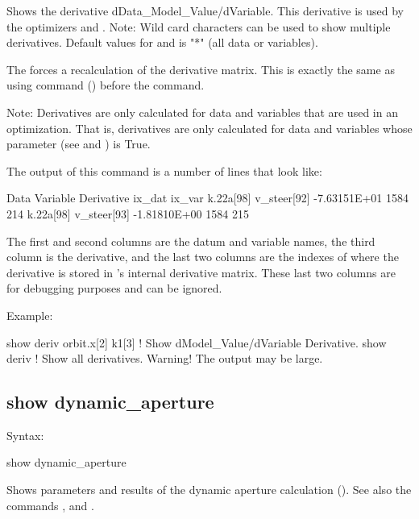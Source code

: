 {{{{{{{{
Shows the derivative dData_Model_Value/dVariable. This derivative is used by the optimizers 
and . Note: Wild card characters can be used to show multiple derivatives.  Default values
for  and  is "*" (all data or variables).

The  forces a recalculation of the derivative matrix. This is exactly the
same as using  command () before the  command.

Note: Derivatives are only calculated for data and variables that are used in an optimization. That
is, derivatives are only calculated for data and variables whose  parameter (see
 and ) is True.

The output of this command is a number of lines that look like:
\begin{example}
  Data                Variable               Derivative   ix_dat  ix_var
  k.22a[98]           v_steer[92]           -7.63151E+01    1584     214
  k.22a[98]           v_steer[93]           -1.81810E+00    1584     215
\end{example}
The first and second columns are the datum and variable names, the third column is the derivative,
and the last two columns are the indexes of where the derivative is stored in \tao's internal
derivative matrix. These last two columns are for debugging purposes and can be ignored.

Example:
\begin{example}
  show deriv orbit.x[2] k1[3] ! Show dModel_Value/dVariable Derivative.
  show deriv                  ! Show all derivatives. Warning! The output may be large.

\end{example}


\subsection{show dynamic_aperture}
\label{s:show.da}

Syntax:
\begin{example}
  show dynamic_aperture
\end{example}

Shows parameters and results of the dynamic aperture calculation ().
See also the commands , and .

}}}}}}}}
